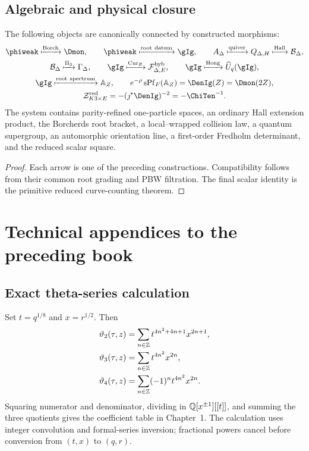 \chapter{Algebraic and physical closure}
\begin{theorem}
The following objects are canonically connected by constructed morphisms:
\[
\begin{gathered}
 \phiweak\xmapsto{\mathrm{Borch}}\Dmon,
 \qquad
 \phiweak\xmapsto{\mathrm{root\ datum}}\gIg,
 \qquad
 A_\Delta\xmapsto{\mathrm{quiver}}Q_{\Delta,H}
 \xmapsto{\mathrm{Hall}}\mathcal B_\Delta,\\
 \mathcal B_\Delta\xmapsto{\Pi_3}\Gamma_\Delta,
 \qquad
 \gIg\xmapsto{\Cur_E}\mathcal F^{\mathrm{hyb}}_{\Delta,E},
 \qquad
 \gIg\xmapsto{\mathrm{Hong}}\widehat U_q(\gIg),\\
 \gIg\xmapsto{\mathrm{root\ spectrum}}\mathbb A_Z,
 \qquad
 e^{-\rho}\operatorname{sPf}_F(\mathbb A_Z)=\DenIg(Z)=\Dmon(2Z),\\
 \mathcal Z^{\red}_{K3\times E}=-(\jmath^*\DenIg)^{-2}=-\ChiTen^{-1}.
\end{gathered}
\]
The system contains parity-refined one-particle spaces, an ordinary Hall extension product, the Borcherds root bracket, a local--wrapped collision law, a quantum supergroup, an automorphic orientation line, a first-order Fredholm determinant, and the reduced scalar square.
\end{theorem}
\begin{proof}
Each arrow is one of the preceding constructions.  Compatibility follows from their common root grading and PBW filtration.  The final scalar identity is the primitive reduced curve-counting theorem.
\end{proof}


\part{Technical appendices to the preceding book}
\chapter{Exact theta-series calculation}\label{app:theta-computation}
Set $t=q^{1/8}$ and $x=r^{1/2}$. Then
\[
\begin{aligned}
\vartheta_2(\tau,z)&=\sum_{n\in\mathbb Z}t^{4n^2+4n+1}x^{2n+1},\\
\vartheta_3(\tau,z)&=\sum_{n\in\mathbb Z}t^{4n^2}x^{2n},\\
\vartheta_4(\tau,z)&=\sum_{n\in\mathbb Z}(-1)^nt^{4n^2}x^{2n}.
\end{aligned}
\]
Squaring numerator and denominator, dividing in $\mathbb Q[x^{\pm1}][[t]]$, and summing the three quotients gives the coefficient table in Chapter~1. The calculation uses integer convolution and formal-series inversion; fractional powers cancel before conversion from $(t,x)$ to $(q,r)$.

